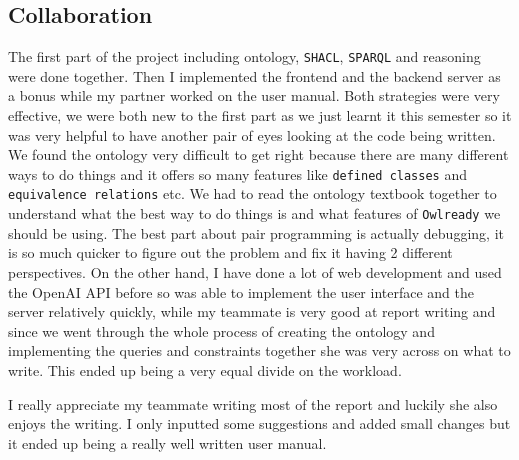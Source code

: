 \documentclass{article}
\begin{document}
\subsection*{Collaboration}
The first part of the project including ontology, \verb|SHACL|, \verb|SPARQL| and reasoning were done together. Then I implemented the frontend and the backend server as a bonus while my partner worked on the user manual. Both strategies were very effective, we were both new to the first part as we just learnt it this semester so it was very helpful to have another pair of eyes looking at the code being written. We found the ontology very difficult to get right because there are many different ways to do things and it offers so many features like \verb|defined classes| and \verb|equivalence relations| etc. We had to read the ontology textbook together to understand what the best way to do things is and what features of \verb|Owlready| we should be using. The best part about pair programming is actually debugging, it is so much quicker to figure out the problem and fix it having 2 different perspectives. On the other hand, I have done a lot of web development and used the OpenAI API before so was able to implement the user interface and the server relatively quickly, while my teammate is very good at report writing and since we went through the whole process of creating the ontology and implementing the queries and constraints together she was very across on what to write. This ended up being a very equal divide on the workload.

I really appreciate my teammate writing most of the report and luckily she also enjoys the writing. I only inputted some suggestions and added small changes but it ended up being a really well written user manual.
\end{document}
